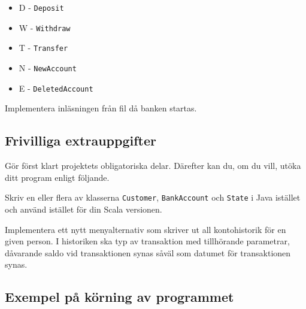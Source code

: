 \begin{itemize}
\item D - \texttt{Deposit}
\item W - \texttt{Withdraw}
\item T - \texttt{Transfer}
\item N - \texttt{NewAccount}
\item E - \texttt{DeletedAccount}
\end{itemize}

\Subtask Implementera inläsningen från fil då banken startas.


\subsection{Frivilliga extrauppgifter}

Gör först klart projektets obligatoriska delar. Därefter kan du, om du vill, utöka ditt
program enligt följande.

\Task Skriv en eller flera av klasserna \texttt{Customer}, \texttt{BankAccount} och \texttt{State} i Java istället och använd istället för din Scala versionen.

\Task	Implementera ett nytt menyalternativ som skriver ut all kontohistorik för en given person. I historiken ska typ av transaktion med tillhörande parametrar, dåvarande saldo vid transaktionen synas såväl som datumet för transaktionen synas.

\subsection{Exempel på körning av programmet}

